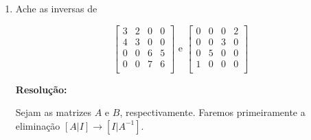 \documentclass[leqno]{article}
\begin{document}
\begin{enumerate}
    \item Ache as inversas de
    
    $$\begin{bmatrix}
    3 & 2 & 0 & 0\\
    4 & 3 & 0 & 0\\
    0 & 0 & 6 & 5\\
    0 & 0 & 7 & 6\\
    \end{bmatrix}\text{ e }\begin{bmatrix}
    0 & 0 & 0 & 2\\
    0 & 0 & 3 & 0\\
    0 & 5 & 0 & 0\\
    1 & 0 & 0 & 0\\
    \end{bmatrix}$$
    
    \textbf{Resolução:}
    
    Sejam as matrizes $A$ e $B$, respectivamente. Faremos primeiramente a eliminação $[A|I]\rightarrow[I|A^{-1}]$.
    

\end{enumerate}
\end{document}

